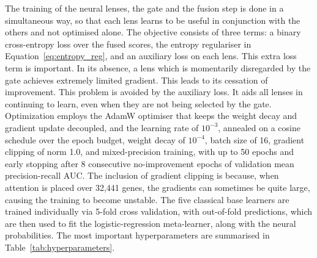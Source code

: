 The training of the neural lenses, the gate and the fusion step is done in a simultaneous way,
so that each lens learns to be useful in conjunction with the others and not optimised alone.
The objective consists of three terms: a binary cross-entropy loss over the fused scores, the
entropy regulariser in Equation~\eqref{eq:entropy_reg}, and an auxiliary loss on each lens. This extra loss term is important. In its absence, a lens which is momentarily disregarded by
the gate achieves extremely limited gradient. This leads to its cessation of improvement. This
problem is avoided by the auxiliary loss. It aids all lenses in continuing to learn, even when
they are not being selected by the gate. Optimization
employs the AdamW optimiser that keeps the weight decay and gradient update decoupled, and the
learning rate of $10^{-3}$, annealed on a cosine schedule over the epoch budget, weight decay
of $10^{-4}$, batch size of 16, gradient clipping of norm 1.0, and mixed-precision training,
with up to 50 epochs and early stopping after 8 consecutive no-improvement epochs of
validation mean precision-recall AUC. The inclusion of gradient clipping is because, when
attention is placed over 32{,}441 genes, the gradients can sometimes be quite large, causing
the training to become unstable. The five classical base learners are trained individually via
5-fold cross validation, with out-of-fold predictions, which are then used to fit the
logistic-regression meta-learner, along with the neural probabilities. The most important
hyperparameters are summarised in Table~\ref{tab:hyperparameters}.

